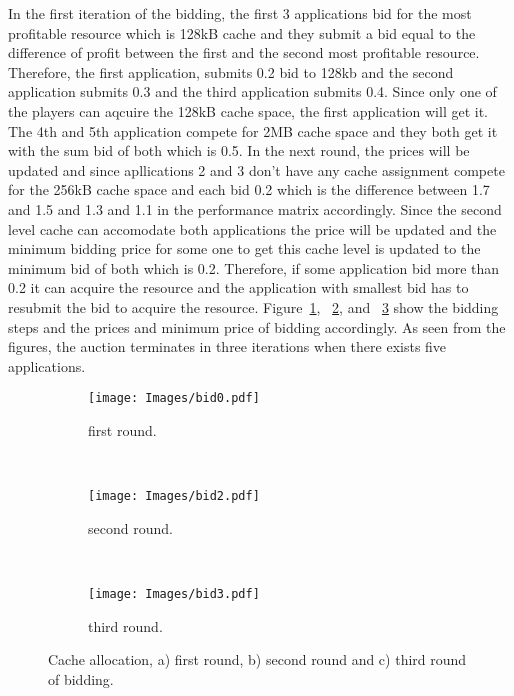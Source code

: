 In the first iteration of the bidding, the first 3 applications bid for the most profitable resource which is 128kB cache and they submit a bid equal to the difference of profit between the first and the second most profitable resource. Therefore, the first application, submits 0.2 bid to 128kb and the second application submits 0.3 and the third application submits 0.4. Since only one of the players can aqcuire the 128kB cache space, the first application will get it. The 4th and 5th application compete for 2MB cache space and they both get it with the sum bid of both which is 0.5. In the next round, the prices will be updated and since apllications 2 and 3 don't have any cache assignment compete for the 256kB cache space and each bid 0.2 which is the difference between 1.7 and 1.5 and 1.3 and 1.1 in the performance matrix accordingly. Since the second level cache can accomodate both applications the price will be updated and the minimum bidding price for some one to get this cache level is updated to the minimum bid of both which is 0.2. Therefore, if some application bid more than 0.2 it can acquire the resource and the application with smallest bid has to resubmit the bid to acquire the resource. Figure~\ref{fig:first_round}, ~\ref{fig:second_round}, and ~\ref{fig:third_round} show the bidding steps and the prices and minimum price of bidding accordingly. As seen from the figures, the auction terminates in three iterations when there exists five applications. \\
\begin{figure*}[!htb]
        \centering
        \begin{subfigure}[b]{0.25\textwidth} %
                \texttt{[image: Images/bid0.pdf]}
                \caption{first round.}
                \label{fig:first_round}
        \end{subfigure}%
        ~ %
        \begin{subfigure}[b]{0.25\textwidth}
                \texttt{[image: Images/bid2.pdf]}
                \caption{second round.}
                \label{fig:second_round}
        \end{subfigure}
        ~ %
        \begin{subfigure}[b]{0.25\textwidth}
                \texttt{[image: Images/bid3.pdf]}
                \caption{third round.}
                \label{fig:third_round}
        \end{subfigure}  

                \caption{Cache allocation, a) first round, b) second round and c) third round of bidding.}\label{fig:Auction_rounds}    
\end{figure*}

